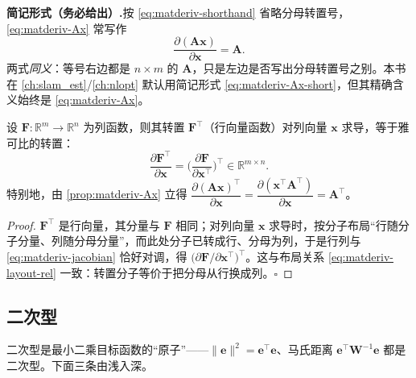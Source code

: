 \begin{note}
\textbf{简记形式（务必给出）.}\;按 \cref{eq:matderiv-shorthand} 省略分母转置号，\cref{eq:matderiv-Ax} 常写作
\begin{equation}
  \frac{\partial(\mathbf{A}\mathbf{x})}{\partial\mathbf{x}}=\mathbf{A}.
  \label{eq:matderiv-Ax-short}
\end{equation}
两式\emph{同义}：等号右边都是 $n\times m$ 的 $\mathbf{A}$，只是左边是否写出分母转置号之别。本书在 \cref{ch:slam_est}/\cref{ch:nlopt} 默认用简记形式 \cref{eq:matderiv-Ax-short}，但其精确含义始终是 \cref{eq:matderiv-Ax}。
\end{note}

\begin{proposition}[行向量函数对列向量求导 $=$ 转置规则]\label{prop:matderiv-transpose}
设 $\mathbf{F}:\mathbb{R}^m\to\mathbb{R}^n$ 为列函数，则其转置 $\mathbf{F}^\top$（行向量函数）对列向量 $\mathbf{x}$ 求导，等于雅可比的转置：
\begin{equation}
  \frac{\partial\mathbf{F}^\top}{\partial\mathbf{x}}
  =\Big(\frac{\partial\mathbf{F}}{\partial\mathbf{x}^\top}\Big)^{\!\top}\in\mathbb{R}^{m\times n}.
  \label{eq:matderiv-transpose}
\end{equation}
特别地，由 \cref{prop:matderiv-Ax} 立得 $\dfrac{\partial(\mathbf{A}\mathbf{x})^\top}{\partial\mathbf{x}}=\dfrac{\partial(\mathbf{x}^\top\mathbf{A}^\top)}{\partial\mathbf{x}}=\mathbf{A}^\top$。
\end{proposition}
\begin{proof}
$\mathbf{F}^\top$ 是行向量，其分量与 $\mathbf{F}$ 相同；对列向量 $\mathbf{x}$ 求导时，按分子布局“行随分子分量、列随分母分量”，而此处分子已转成行、分母为列，于是行列与 \cref{eq:matderiv-jacobian} 恰好对调，得 $\big(\partial\mathbf{F}/\partial\mathbf{x}^\top\big)^\top$。这与布局关系 \cref{eq:matderiv-layout-rel} 一致：转置分子等价于把分母从行换成列。\hfill$\square$
\end{proof}

\subsection{二次型}
\label{sec:matderiv-quadratic}

二次型是最小二乘目标函数的“原子”——$\|\mathbf{e}\|^2=\mathbf{e}^\top\mathbf{e}$、马氏距离 $\mathbf{e}^\top\mathbf{W}^{-1}\mathbf{e}$ 都是二次型。下面三条由浅入深。

